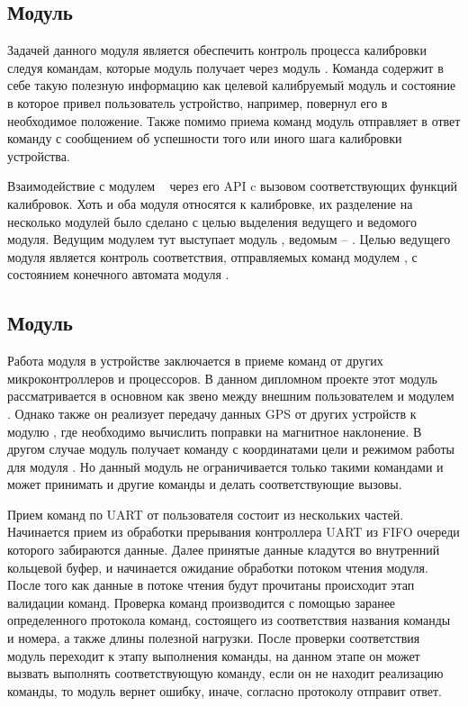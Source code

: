 

\subsection{Модуль \moduleCalibControl}

Задачей данного модуля является обеспечить контроль процесса калибровки следуя командам, которые модуль получает
через модуль \moduleUart. Команда содержит в себе такую полезную информацию как целевой калибруемый модуль и состояние 
в которое привел пользователь устройство, например, повернул его в необходимое положение. Также помимо приема команд 
модуль отправляет в ответ команду с сообщением об успешности того или иного шага калибровки устройства.

Взаимодействие с модулем \moduleCalib~ через его API c вызовом соответствующих функций калибровок. Хоть и оба модуля относятся к калибровке,
их разделение на несколько модулей было сделано с целью выделения ведущего и ведомого модуля. Ведущим модулем тут выступает модуль \moduleCalibControl, 
ведомым  -- \moduleCalib. Целью ведущего модуля является контроль соответствия, отправляемых команд модулем \moduleUart, с состоянием конечного 
автомата модуля \moduleCalib. 


\subsection{Модуль \moduleUart}

Работа модуля в устройстве заключается в приеме команд от других микроконтроллеров и процессоров. В данном дипломном проекте
этот модуль рассматривается в основном как звено между внешним пользователем и модулем \moduleCalib. Однако также он реализует
передачу данных GPS от других устройств к модулю \moduleOrientationAzimuth , где необходимо вычислить поправки на магнитное наклонение.
В другом случае модуль получает команду с координатами цели и режимом работы для модуля \moduleFindTarget . 
Но данный модуль не ограничивается только такими командами и  может принимать и другие команды и делать соответствующие вызовы.

Прием команд по UART от пользователя состоит из нескольких частей. Начинается прием из обработки прерывания контроллера UART из 
FIFO очереди которого забираются данные. Далее принятые данные кладутся во внутренний кольцевой буфер, и начинается ожидание обработки
потоком чтения модуля. После того как данные в потоке чтения будут прочитаны происходит этап валидации команд. 
Проверка команд производится с помощью заранее определенного протокола команд, состоящего из соответствия названия команды и номера, 
а также длины полезной нагрузки. После проверки соответствия модуль переходит к этапу выполнения команды, на данном этапе он может вызвать
выполнять соответствующую команду, если он не находит реализацию команды, то модуль вернет ошибку, иначе, согласно протоколу отправит ответ.

